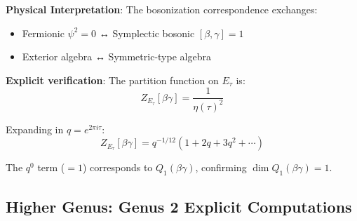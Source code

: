 \begin{example}
\textbf{Physical Interpretation}: The bosonization correspondence exchanges:
\begin{itemize}
\item Fermionic $\psi^2 = 0$ ↔ Symplectic bosonic $[\beta,\gamma] = 1$
\item Exterior algebra ↔ Symmetric-type algebra
\end{itemize}

\textbf{Explicit verification}: The partition function on $E_\tau$ is:
\begin{equation}
Z_{E_\tau}[\beta\gamma] = \frac{1}{\eta(\tau)^2}
\end{equation}

Expanding in $q = e^{2\pi i \tau}$:
\begin{equation}
Z_{E_\tau}[\beta\gamma] = q^{-1/12} (1 + 2q + 3q^2 + \cdots)
\end{equation}

The $q^0$ term ($= 1$) corresponds to $Q_1(\beta\gamma)$, confirming 
$\dim Q_1(\beta\gamma) = 1$.
\end{example}

\subsection{Higher Genus: Genus 2 Explicit Computations}

